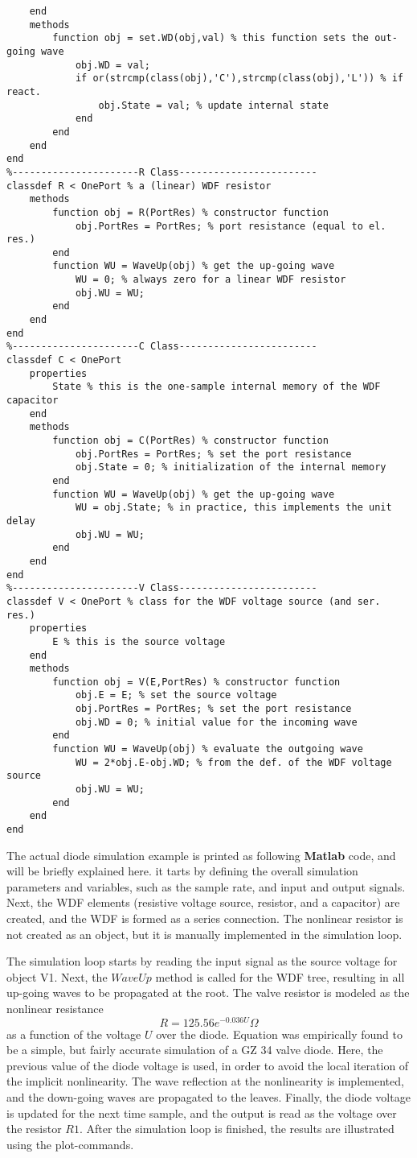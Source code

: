 \documentclass[10pt,a4paper,oneside]{article}
\begin{document}
\begin{lstlisting}
	end
	methods 
		function obj = set.WD(obj,val) % this function sets the out-going wave
			obj.WD = val;
			if or(strcmp(class(obj),'C'),strcmp(class(obj),'L')) % if react.
				obj.State = val; % update internal state
			end
		end
	end 
end
%----------------------R Class------------------------
classdef R < OnePort % a (linear) WDF resistor
	methods 
		function obj = R(PortRes) % constructor function
			obj.PortRes = PortRes; % port resistance (equal to el. res.)
		end
		function WU = WaveUp(obj) % get the up-going wave
			WU = 0; % always zero for a linear WDF resistor
			obj.WU = WU;
		end
	end 
end
%----------------------C Class------------------------
classdef C < OnePort
	properties
		State % this is the one-sample internal memory of the WDF capacitor
	end
	methods 
		function obj = C(PortRes) % constructor function
			obj.PortRes = PortRes; % set the port resistance
			obj.State = 0; % initialization of the internal memory
		end
		function WU = WaveUp(obj) % get the up-going wave
			WU = obj.State; % in practice, this implements the unit delay
			obj.WU = WU;
		end
	end 
end
%----------------------V Class------------------------
classdef V < OnePort % class for the WDF voltage source (and ser. res.)
	properties
		E % this is the source voltage
	end
	methods 
		function obj = V(E,PortRes) % constructor function
			obj.E = E; % set the source voltage
			obj.PortRes = PortRes; % set the port resistance
			obj.WD = 0; % initial value for the incoming wave
		end
		function WU = WaveUp(obj) % evaluate the outgoing wave
			WU = 2*obj.E-obj.WD; % from the def. of the WDF voltage source
			obj.WU = WU;
		end
	end 
end
\end{lstlisting}
The actual diode simulation example is printed as following {\bfseries Matlab} code, and will be briefly explained here. it tarts by defining the overall simulation parameters and variables, such as the sample rate, and input and output signals. Next, the WDF elements (resistive voltage source, resistor, and a capacitor) are created, and the WDF is formed as a series connection. The nonlinear resistor is not created as an object, but it is manually implemented in the simulation loop.

The simulation loop starts by reading the input signal as the source voltage for object V1. Next, the $WaveUp$ method is called for the WDF tree, resulting in all up-going waves to be propagated at the root. The valve resistor is modeled as the nonlinear resistance
\[
R=125.56e^{-0.036U}\Omega
\]
as a function of the voltage $U$ over the diode. Equation was empirically found to be a simple, but fairly accurate simulation of a GZ 34 valve diode. Here, the previous value of the diode voltage is used, in order to avoid the local iteration of the implicit nonlinearity. The wave reflection at the nonlinearity is implemented, and the down-going waves are propagated to the leaves. Finally, the diode voltage is updated for the next time sample, and the output is read as the voltage over the resistor $R1$. After the simulation loop is finished, the results are illustrated using the plot-commands.
\end{document}

